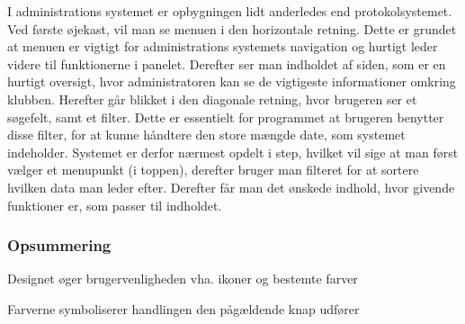 
I administrations systemet er opbygningen lidt anderledes end protokolsystemet. Ved første øjekast, vil man se menuen i den horizontale retning. Dette er grundet at menuen er vigtigt for administrations systemets navigation og hurtigt leder videre til funktionerne i panelet. Derefter ser man indholdet af siden, som er en hurtigt oversigt, hvor administratoren kan se de vigtigeste informationer omkring klubben. Herefter går blikket i den diagonale retning, hvor brugeren ser et søgefelt, samt et filter. Dette er essentielt for programmet at brugeren benytter disse filter, for at kunne håndtere den store mængde date, som systemet indeholder. Systemet er derfor nærmest opdelt i step, hvilket vil sige at man først vælger et menupunkt (i toppen), derefter bruger man filteret for at sortere hvilken data man leder efter. Derefter får man det ønskede indhold, hvor givende funktioner er, som passer til indholdet.

\subsubsection*{Opsummering}

\begin{itemize_small}
    \item Designet øger brugervenligheden vha. ikoner og bestemte farver
    \item Farverne symboliserer handlingen den pågældende knap udfører
\end{itemize_small}



